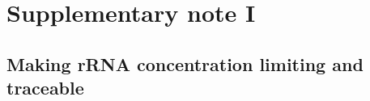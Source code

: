 
\FloatBarrier
\clearpage

\section{Supplementary note I}
\label{supp:ribo:1}

\subsection{Making rRNA concentration limiting and traceable}



